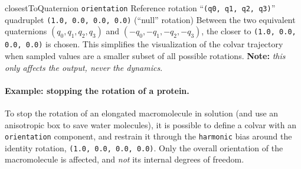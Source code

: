 \begin{cvcoptions}
\item %
\item %
\item %


\item %
  \keydef
    {closestToQuaternion}{%
    \texttt{orientation}}{%
    Reference rotation}{%
    ``\texttt{(q0, q1, q2, q3)}'' quadruplet}{%
    \texttt{(1.0, 0.0, 0.0, 0.0)} (``null'' rotation)}{%
    Between the two equivalent quaternions $(q_0, q_1, q_2, q_3)$ and
    $(-q_0, -q_1, -q_2, -q_3)$, the closer to \texttt{(1.0, 0.0, 0.0,
      0.0)} is chosen.  This simplifies the visualization of the
    colvar trajectory when sampled values are a smaller subset of all
    possible rotations.  \textbf{Note:} \emph {this only affects the
      output, never the dynamics}.}

\end{cvcoptions}


\paragraph*{Example: stopping the rotation of a protein.}  To stop the
rotation of an elongated macromolecule in solution (and use an
anisotropic box to save water molecules), it is possible to define a
colvar with an \texttt{orientation} component, and restrain it through
the \texttt{harmonic} bias around the identity rotation, \texttt{(1.0,
  0.0, 0.0, 0.0)}.  Only the overall orientation of the macromolecule
is affected, and \emph{not} its internal degrees of freedom.  

